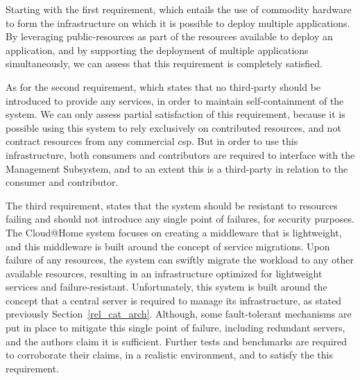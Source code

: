 \documentclass[12pt, titlepage]{uo_temp}
\begin{document}
     Starting with the first requirement, which entails the use of commodity hardware to
     form the infrastructure on which it is possible to deploy multiple applications. By
     leveraging public-resources as part of the resources available to deploy an
     application, and by supporting the deployment of multiple applications
     simultaneously, we can assess that this requirement is completely satisfied.

     As for the second requirement, which states that no third-party should be introduced
     to provide any services, in order to maintain self-containment of the system. We can
     only assess partial satisfaction of this requirement, because it is possible using
     this system to rely exclusively on contributed resources, and not contract resources
     from any commercial \gls{csp}. But in order to use this infrastructure, both
     consumers and contributors are required to interface with the Management Subsystem,
     and to an extent this is a third-party in relation to the consumer and contributor.

     The third requirement, states that the system should be resistant to resources
     failing and should not introduce any single point of failures, for security
     purposes. The Cloud@Home system focuses on creating a middleware that is lightweight,
     and this middleware is built around the concept of service migrations. Upon failure
     of any resources, the system can swiftly migrate the workload to any other available
     resources, resulting in an infrastructure optimized for lightweight services and
     failure-resistant. Unfortunately, this system is built around the concept that a
     central server is required to manage its infrastructure, as stated previously
     Section~\ref{rel_cat_arch}. Although, some fault-tolerant mechanisms are put in place
     to mitigate this single point of failure, including redundant servers, and the
     authors claim it is sufficient. Further tests and benchmarks are required to
     corroborate their claims, in a realistic environment, and to satisfy the this
     requirement.
\end{document}
